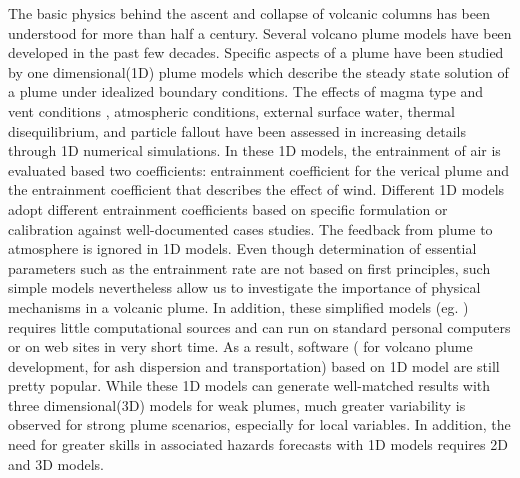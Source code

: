 \documentclass[10pt,a4paper]{article}
\begin{document}
The basic physics behind the ascent and collapse of volcanic columns has been understood for more than half a century\citep{morton1956turbulent, settle1978volcanic, wilson1978control}. Several volcano plume models have been developed in the past few decades. Specific aspects of a plume have been studied by one dimensional(1D) plume models which describe the steady state solution of a plume under idealized boundary conditions.
The effects of magma type and vent conditions \citep{woods1988fluid, woods1995decompression}, atmospheric conditions\citep{sparks1997volcanic, woods1993moist, bursik2001effect}, external surface water\citep{koyaguchi1996formation}, thermal disequilibrium, and particle fallout\citep{woods1991particle} have been assessed in increasing details through 1D numerical simulations. In these 1D models, the entrainment of air is evaluated based two coefficients: entrainment coefficient for the verical plume and the entrainment coefficient that describes the effect of wind. Different 1D models adopt different entrainment coefficients based on specific formulation or calibration against well-documented cases studies. The feedback from plume to atmosphere is ignored in 1D models. Even though determination of essential parameters such as the entrainment rate are not based on first principles, such simple models nevertheless allow us to investigate the importance of physical mechanisms in a volcanic plume. In addition, these simplified models (eg. \citep{mastin2007user}) requires little computational sources and can run on standard personal computers or on web sites in very short time. As a result, software (\citep{267, 1194, 3541} for volcano plume development, \citep{114, draxler2015hysplit} for ash dispersion and transportation) based on 1D model are still pretty popular. While these 1D models can generate well-matched results with three dimensional(3D) models for weak plumes, much greater variability is observed for strong plume scenarios, especially for local variables\cite{costa2016results}. In addition, the need for greater skills in associated hazards forecasts with 1D models requires 2D and 3D models.\\
\end{document}
